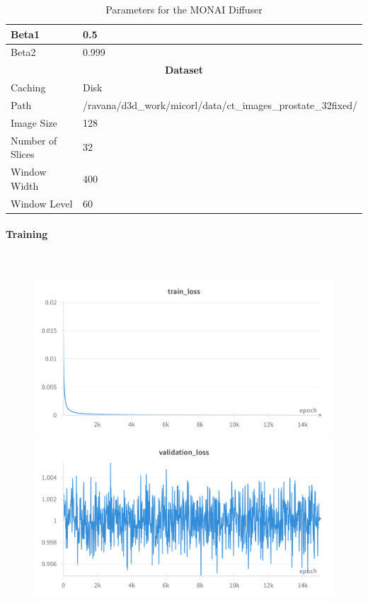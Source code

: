 \begin{table}[H!]
\begin{tabular}{|l|l|}
\hline
Beta1 & 0.5 \\
\hline
Beta2 & 0.999 \\
\hline
\multicolumn{2}{|c|}{\textbf{Dataset}} \\
\hline
Caching & Disk \\
\hline
Path & /ravana/d3d\_work/micorl/data/ct\_images\_prostate\_32fixed/ \\
\hline
Image Size & 128 \\
\hline
Number of Slices & 32 \\
\hline
Window Width & 400 \\
\hline
Window Level & 60 \\
\hline
\end{tabular}
\caption{Parameters for the MONAI Diffuser}
\label{table:monai_diffuser_params}
\end{table}

\paragraph{Training}\mbox{}\\

\begin{figure}[H]
\includegraphics[width=\linewidth]{detailed_engineering/Monai Diffusion - Attempt 1/charts/train_loss.png}
\caption{}
\endminipage\hfill
{}
\includegraphics[width=\linewidth]{detailed_engineering/Monai Diffusion - Attempt 1/charts/validation_loss.png}
\caption{}
\label{fig:ldm_a1_val_loss}
\endminipage
\end{figure}



